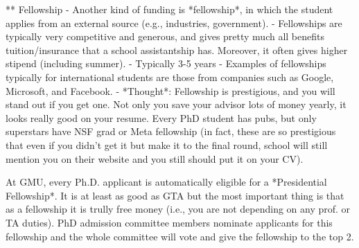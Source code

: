 \documentclass[10pt]{article}
\begin{document}
** Fellowship
- Another kind of funding is *fellowship*, in which the student applies from an external source (e.g., industries, government). 
- Fellowships are typically very competitive and generous, and gives pretty much all benefits tuition/insurance that a school assistantship has.  Moreover, it often gives higher stipend (including summer).
  - Typically 3-5 years
  - Examples of fellowships typically for international students are those from companies such as Google, Microsoft, and Facebook.
- *Thought*: Fellowship is prestigious, and you will stand out if you get one.  Not only you save your advisor lots of money yearly, it looks really good on your resume.  Every PhD student has pubs, but only superstars have NSF grad or Meta fellowship (in fact, these are so prestigious that even if you didn't get it but make it to the final round, school will still mention you on their website and you still should put it on your CV).


\begin{tcolorbox}[left=1pt,right=1pt,top=1pt,bottom=1pt]
At GMU, every Ph.D. applicant is automatically eligible for a *Presidential Fellowship*.  It is at least as good as GTA but the most important thing is that as a fellowship it is trully free money (i.e., you are not depending on any prof. or TA duties).  PhD admission committee members nominate applicants for this fellowship and the whole committee will vote and give the fellowship to the top 2.
\end{tcolorbox}





\newpage
\end{document}
